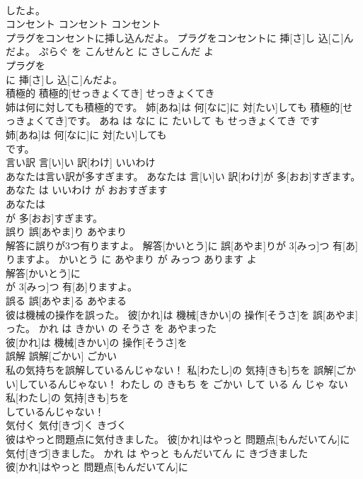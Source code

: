 \documentclass[8pt]{extreport}
\begin{document}
\begin{CJK}{UTF8}{min}
\\	したよ。			
\\	コンセント	コンセント	コンセント	
\\	プラグをコンセントに挿し込んだよ。	プラグをコンセントに 挿[さ]し 込[こ]んだよ。	ぷらぐ を こんせんと に さしこんだ よ	
\\	プラグを
\\	に 挿[さ]し 込[こ]んだよ。			
\\	積極的	積極的[せっきょくてき]	せっきょくてき	
\\	姉は何に対しても積極的です。	姉[あね]は 何[なに]に 対[たい]しても 積極的[せっきょくてき]です。	あね は なに に たいして も せっきょくてき です	
\\	姉[あね]は 何[なに]に 対[たい]しても
\\	です。			
\\	言い訳	言[い]い 訳[わけ]	いいわけ	
\\	あなたは言い訳が多すぎます。	あなたは 言[い]い 訳[わけ]が 多[おお]すぎます。	あなた は いいわけ が おおすぎます	
\\	あなたは
\\	が 多[おお]すぎます。			
\\	誤り	誤[あやま]り	あやまり	
\\	解答に誤りが3つ有りますよ。	解答[かいとう]に 誤[あやま]りが 3[みっ]つ 有[あ]りますよ。	かいとう に あやまり が みっつ あります よ	
\\	解答[かいとう]に
\\	が 3[みっ]つ 有[あ]りますよ。			
\\	誤る	誤[あやま]る	あやまる	
\\	彼は機械の操作を誤った。	彼[かれ]は 機械[きかい]の 操作[そうさ]を 誤[あやま]った。	かれ は きかい の そうさ を あやまった	
\\	彼[かれ]は 機械[きかい]の 操作[そうさ]を
\\	誤解	誤解[ごかい]	ごかい	
\\	私の気持ちを誤解しているんじゃない！	私[わたし]の 気持[きも]ちを 誤解[ごかい]しているんじゃない！	わたし の きもち を ごかい して いる ん じゃ ない	
\\	私[わたし]の 気持[きも]ちを
\\	しているんじゃない！			
\\	気付く	気付[きづ]く	きづく	
\\	彼はやっと問題点に気付きました。	彼[かれ]はやっと 問題点[もんだいてん]に 気付[きづ]きました。	かれ は やっと もんだいてん に きづきました	
\\	彼[かれ]はやっと 問題点[もんだいてん]に

\end{CJK}
\end{document}
